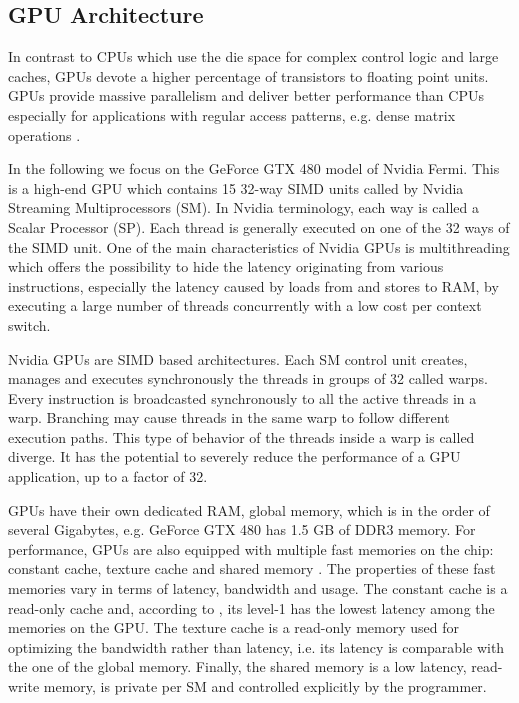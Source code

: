 \subsection{GPU Architecture}

In contrast to CPUs which use the die space for complex control logic and large
caches, GPUs devote a higher percentage of transistors to floating point units.
GPUs provide massive parallelism and deliver better performance than CPUs
especially for applications with regular access patterns, e.g. dense matrix
operations \cite{vol2008}.

In the following we focus on the GeForce GTX 480 model of Nvidia Fermi.
This is a high-end GPU which contains 15 32-way SIMD units called by Nvidia
Streaming Multiprocessors (SM). In Nvidia terminology, each way is called a
Scalar Processor (SP). Each thread is generally executed on one of the 32 ways
of the SIMD unit. One of the main characteristics of Nvidia GPUs is multithreading
which offers the possibility to hide the latency originating from various
instructions, especially the latency caused by loads from and stores to RAM, by
executing a large number of threads concurrently with a low cost per context
switch.

Nvidia GPUs are SIMD based architectures. Each SM control unit creates, manages
and executes synchronously the threads in groups of 32 called warps. Every
instruction is broadcasted synchronously to all the active threads in a warp.
Branching may cause threads in the same warp to follow different execution
paths. This type of behavior of the threads inside a warp is called diverge. It
has the potential to severely reduce the performance of a GPU application, up to
a factor of 32.

GPUs have their own dedicated RAM, global memory, which is in the order of
several Gigabytes, e.g. GeForce GTX 480 has 1.5 GB of DDR3 memory. For
performance, GPUs are also equipped with multiple fast memories on the chip:
constant cache, texture cache and shared memory \cite{ryo2008}. The properties
of these fast memories vary in terms of latency, bandwidth and usage. The
constant cache is a read-only cache and, according to \cite{won2010}, its
level-1 has the lowest latency among the memories on the GPU. The texture cache
is a read-only memory used for optimizing the bandwidth rather than latency,
i.e. its latency is comparable with the one of the global memory. Finally, the
shared memory is a low latency, read-write memory, is private per SM and
controlled explicitly by the programmer.


